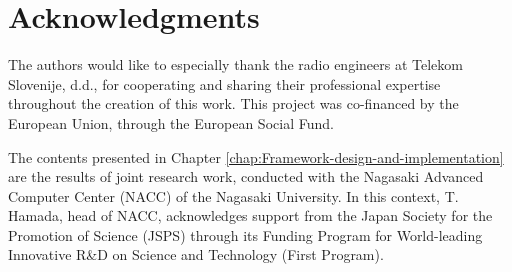 
\chapter{Acknowledgments}


\noindent The authors would like to especially thank the radio engineers
at Telekom Slovenije, d.d., for cooperating and sharing their professional
expertise throughout the creation of this work. This project was co-financed
by the European Union, through the European Social Fund.

The contents presented in Chapter \ref{chap:Framework-design-and-implementation}
are the results of joint research work, conducted with the Nagasaki
Advanced Computer Center (NACC) of the Nagasaki University. In this
context, T. Hamada, head of NACC, acknowledges support from the Japan
Society for the Promotion of Science (JSPS) through its Funding Program
for World-leading Innovative R\&D on Science and Technology (First
Program).
